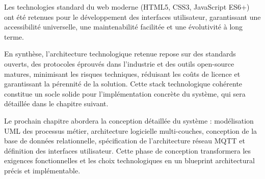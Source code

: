 Les technologies standard du web moderne (HTML5, CSS3, JavaScript ES6+) ont été retenues pour le développement des interfaces utilisateur, garantissant une accessibilité universelle, une maintenabilité facilitée et une évolutivité à long terme.

En synthèse, l'architecture technologique retenue repose sur des standards ouverts, des protocoles éprouvés dans l'industrie et des outils open-source matures, minimisant les risques techniques, réduisant les coûts de licence et garantissant la pérennité de la solution. Cette stack technologique cohérente constitue un socle solide pour l'implémentation concrète du système, qui sera détaillée dans le chapitre suivant.

Le prochain chapitre abordera la conception détaillée du système : modélisation UML des processus métier, architecture logicielle multi-couches, conception de la base de données relationnelle, spécification de l'architecture réseau MQTT et définition des interfaces utilisateur. Cette phase de conception transformera les exigences fonctionnelles et les choix technologiques en un blueprint architectural précis et implémentable.

\clearpage

